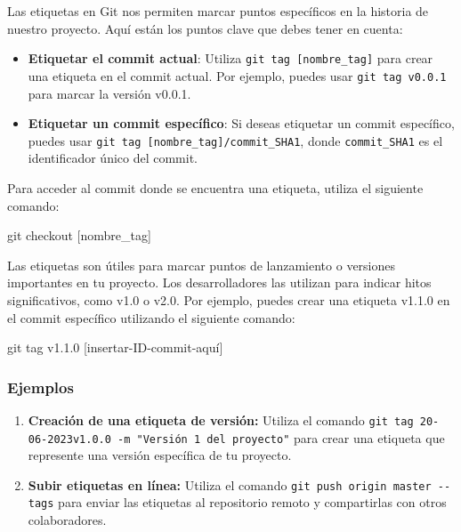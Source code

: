 \documentclass[
  a4paper,
]{article}
\newenvironment{Shaded}{}{}
\newcommand{\FunctionTok}[1]{\textcolor[rgb]{0.44,0.26,0.76}{#1}}
\newcommand{\NormalTok}[1]{\textcolor[rgb]{0.14,0.16,0.18}{#1}}
\newcommand{\PreprocessorTok}[1]{\textcolor[rgb]{0.84,0.23,0.29}{#1}}
\newcommand{\SpecialStringTok}[1]{\textcolor[rgb]{0.01,0.18,0.38}{#1}}
\begin{document}
Las etiquetas en Git nos permiten marcar puntos específicos en la
historia de nuestro proyecto. Aquí están los puntos clave que debes
tener en cuenta:

\begin{itemize}
\item
  \textbf{Etiquetar el commit actual}: Utiliza
  \texttt{git\ tag\ {[}nombre\_tag{]}} para crear una etiqueta en el
  commit actual. Por ejemplo, puedes usar \texttt{git\ tag\ v0.0.1} para
  marcar la versión v0.0.1.
\item
  \textbf{Etiquetar un commit específico}: Si deseas etiquetar un commit
  específico, puedes usar
  \texttt{git\ tag\ {[}nombre\_tag{]}/commit\_SHA1}, donde
  \texttt{commit\_SHA1} es el identificador único del commit.
\end{itemize}

Para acceder al commit donde se encuentra una etiqueta, utiliza el
siguiente comando:

\begin{Shaded}
\begin{Highlighting}[]
\FunctionTok{git}\NormalTok{ checkout }\PreprocessorTok{[}\SpecialStringTok{nombre\_tag}\PreprocessorTok{]}
\end{Highlighting}
\end{Shaded}

Las etiquetas son útiles para marcar puntos de lanzamiento o versiones
importantes en tu proyecto. Los desarrolladores las utilizan para
indicar hitos significativos, como v1.0 o v2.0. Por ejemplo, puedes
crear una etiqueta v1.1.0 en el commit específico utilizando el
siguiente comando:

\begin{Shaded}
\begin{Highlighting}[]
\FunctionTok{git}\NormalTok{ tag v1.1.0 }\PreprocessorTok{[}\SpecialStringTok{insertar}\PreprocessorTok{{-}}\SpecialStringTok{ID}\PreprocessorTok{{-}}\SpecialStringTok{commit}\PreprocessorTok{{-}}\SpecialStringTok{aquí}\PreprocessorTok{]}
\end{Highlighting}
\end{Shaded}

\subsubsection{Ejemplos}\label{ejemplos}

\begin{enumerate}
\def\labelenumi{\arabic{enumi}.}
\item
  \textbf{Creación de una etiqueta de versión:} Utiliza el comando
  \texttt{git\ tag\ 20-06-2023v1.0.0\ -m\ "Versión\ 1\ del\ proyecto"}
  para crear una etiqueta que represente una versión específica de tu
  proyecto.
\item
  \textbf{Subir etiquetas en línea:} Utiliza el comando
  \texttt{git\ push\ origin\ master\ -\/-tags} para enviar las etiquetas
  al repositorio remoto y compartirlas con otros colaboradores.
\end{enumerate}
\end{document}
